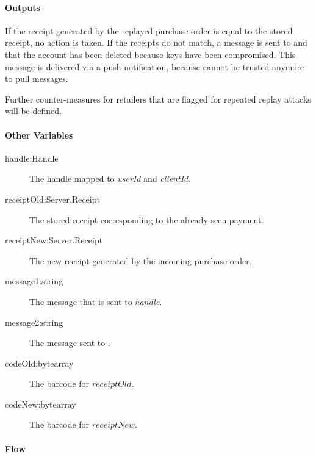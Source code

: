 \documentclass[a4paper,10pt,draft]{article}
\newcommand{\handle}{\emph{handle}}
\newcommand{\userId}{\emph{userId}}
\newcommand{\clientId}{\emph{clientId}}
\begin{document}
\paragraph{Outputs}
If the receipt generated by the replayed purchase order is equal to the stored 
receipt, no action is taken. If the receipts do not match, a message is sent to 
\User{} and \Client{} that the account has been deleted because \Client{} 
keys have been compromised. This message is delivered via a push notification, 
because \Client{} cannot be trusted anymore to pull messages.

Further counter-measures for retailers that are flagged for repeated replay 
attacks will be defined.

\paragraph{Other Variables}
\SpecialItem
\begin{description}
 \item[handle:Handle] The handle mapped to \userId{} and \clientId{}.
 \item[receiptOld:Server.Receipt] The stored receipt corresponding to the 
already seen payment.
 \item[receiptNew:Server.Receipt] The new receipt generated by the incoming 
purchase order.
 \item[message1:string] The message that is sent to \handle{}.
 \item[message2:string] The message sent to \Client{}.
 \item[codeOld:bytearray] The barcode for $receiptOld$.
 \item[codeNew:bytearray] The barcode for $receiptNew$.
\end{description}

\paragraph{Flow}
\end{document}
